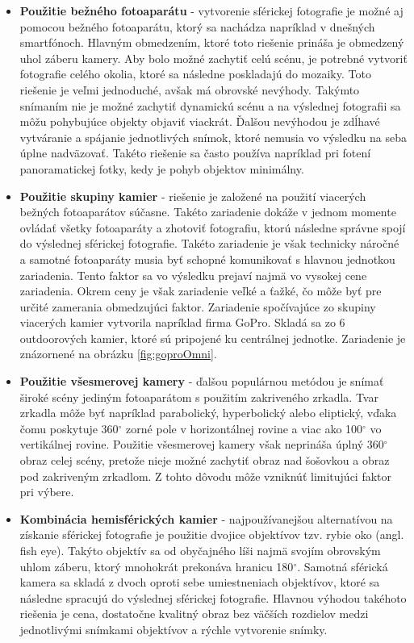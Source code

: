 \documentclass[slovak,master,dept460,male,cpp,cpdeclaration]{diploma}
\begin{document}
\begin{itemize}
\item \textbf{Použitie bežného fotoaparátu} - vytvorenie sférickej fotografie je možné aj pomocou  bežného fotoaparátu, ktorý sa nachádza napríklad v dnešných smartfónoch. Hlavným obmedzením, ktoré toto riešenie prináša je obmedzený uhol záberu kamery. Aby bolo možné zachytiť celú scénu, je potrebné  vytvoriť fotografie celého okolia, ktoré sa následne poskladajú  do mozaiky. Toto riešenie je veľmi jednoduché, avšak má obrovské nevýhody. Takýmto  snímaním nie je možné zachytiť dynamickú scénu a na výslednej fotografii sa môžu pohybujúce objekty objaviť viackrát. Ďalšou nevýhodou je zdĺhavé vytváranie a spájanie jednotlivých snímok, ktoré nemusia vo výsledku  na seba úplne nadväzovať. Takéto riešenie sa často používa napríklad pri  fotení panoramatickej fotky, kedy je pohyb objektov minimálny.

\item \textbf{Použitie skupiny kamier} - riešenie je založené na použití viacerých bežných fotoaparátov súčasne. Takéto zariadenie dokáže v jednom momente ovládať všetky fotoaparáty a zhotoviť fotografiu, ktorú následne správne spojí do výslednej sférickej fotografie. Takéto zariadenie je však technicky náročné a samotné fotoaparáty musia byť schopné komunikovať s hlavnou jednotkou zariadenia. Tento faktor sa vo výsledku prejaví najmä vo vysokej cene zariadenia. Okrem ceny  je však zariadenie veľké a ťažké, čo môže byť pre určité zamerania obmedzujúci faktor. Zariadenie spočívajúce zo skupiny viacerých kamier vytvorila napríklad firma GoPro. Skladá sa zo 6 outdoorových kamier, ktoré sú pripojené ku centrálnej jednotke. Zariadenie je znázornené na obrázku \ref{fig:goproOmni}.

\item \textbf{Použitie všesmerovej kamery} - ďalšou populárnou metódou je snímať široké scény jediným fotoaparátom s použitím zakriveného zrkadla. Tvar zrkadla môže byť napríklad parabolický, hyperbolický alebo eliptický, vďaka čomu  poskytuje 360$ ^\circ$ zorné pole v horizontálnej rovine a viac ako 100$^\circ$ vo vertikálnej rovine. Použitie všesmerovej kamery však neprináša  úplný 360$ ^\circ$  obraz celej scény, pretože nieje možné zachytiť  obraz nad šošovkou a obraz pod zakriveným zrkadlom. Z tohto dôvodu môže vzniknúť limitujúci faktor pri výbere.  

\item \textbf{Kombinácia hemisférických kamier} - najpoužívanejšou alternatívou na získanie sférickej fotografie je použitie dvojice objektívov tzv. rybie oko (angl. fish eye). Takýto objektív sa od obyčajného líši najmä svojím obrovským uhlom záberu, ktorý  mnohokrát prekonáva hranicu 180$ ^\circ$. Samotná sférická kamera sa skladá z dvoch oproti sebe umiestneniach objektívov, ktoré sa následne spracujú do výslednej sférickej fotografie. Hlavnou výhodou takéhoto riešenia je cena, dostatočne kvalitný obraz bez väčších rozdielov medzi jednotlivými snímkami objektívov a rýchle vytvorenie snímky.

\end{itemize}
\end{document}
